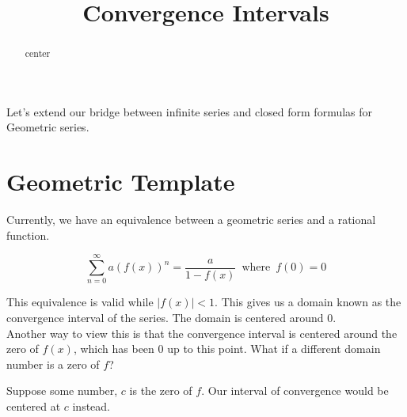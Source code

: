 \documentclass{ximera}
\title{Convergence Intervals}
\begin{document}
\begin{abstract}
center
\end{abstract}
\maketitle






Let's extend our bridge between infinite series and closed form formulas for Geometric series.





\section{Geometric Template}



Currently, we have an equivalence between a geometric series and a rational function.




\[   \sum_{n=0}^{\infty} a (f(x))^n =  \frac{a}{1-f(x)}   \, \text{ where } \, f(0) = 0       \]


This equivalence is valid while $|f(x)| < 1$.  This gives us a domain known as the convergence interval of the series.  The domain is centered around $0$. \\


Another way to view this is that the convergence interval is centered around the zero of $f(x)$, which has been $0$ up to this point.  What if a different domain number is a zero of $f$?


Suppose some number, $c$ is the zero of $f$.  Our interval of convergence would be centered at $c$ instead.
\end{document}

